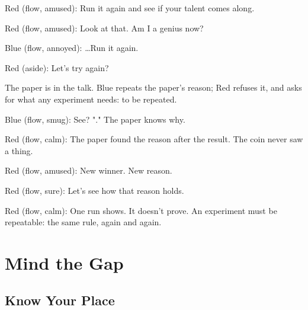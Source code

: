 Red (flow, amused): Run it again and see if your talent comes along.


Red (flow, amused): Look at that. Am I a genius now?

Blue (flow, annoyed): …Run it again.


Red (aside): Let's try again?

\label{why}

The paper is in the talk. Blue repeats the paper's reason; Red refuses it,
and asks for what any experiment needs: to be repeated.


Blue (flow, smug): See? "."
The paper knows why.

Red (flow, calm): The paper found the reason after the result.
The coin never saw a thing.

Red (flow, amused): New winner. New reason.


Red (flow, sure): Let's see how that reason holds.

Red (flow, calm): One run shows. It doesn't prove.
An experiment must be repeatable:
the same rule, again and again.


\chapter{Mind the Gap}\label{chapter:mind-the-gap}

\section{Know Your Place}\label{index:know-your-place}


